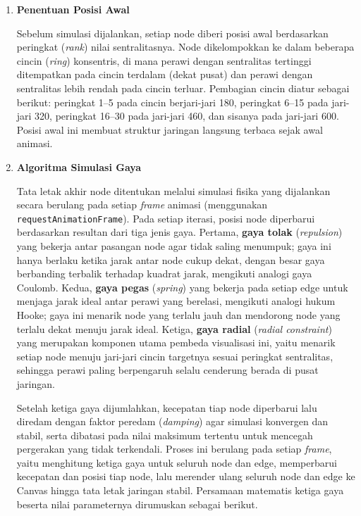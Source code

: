 \begin{enumerate}
\item \textbf{Penentuan Posisi Awal}

Sebelum simulasi dijalankan, setiap node diberi posisi awal berdasarkan peringkat (\textit{rank}) nilai sentralitasnya. Node dikelompokkan ke dalam beberapa cincin (\textit{ring}) konsentris, di mana perawi dengan sentralitas tertinggi ditempatkan pada cincin terdalam (dekat pusat) dan perawi dengan sentralitas lebih rendah pada cincin terluar. Pembagian cincin diatur sebagai berikut: peringkat 1--5 pada cincin berjari-jari 180, peringkat 6--15 pada jari-jari 320, peringkat 16--30 pada jari-jari 460, dan sisanya pada jari-jari 600. Posisi awal ini membuat struktur jaringan langsung terbaca sejak awal animasi.

\item \textbf{Algoritma Simulasi Gaya}

Tata letak akhir node ditentukan melalui simulasi fisika yang dijalankan secara berulang pada setiap \textit{frame} animasi (menggunakan \texttt{requestAnimation}\allowbreak\texttt{Frame}). Pada setiap iterasi, posisi node diperbarui berdasarkan resultan dari tiga jenis gaya. Pertama, \textbf{gaya tolak} (\textit{repulsion}) yang bekerja antar pasangan node agar tidak saling menumpuk; gaya ini hanya berlaku ketika jarak antar node cukup dekat, dengan besar gaya berbanding terbalik terhadap kuadrat jarak, mengikuti analogi gaya Coulomb. Kedua, \textbf{gaya pegas} (\textit{spring}) yang bekerja pada setiap edge untuk menjaga jarak ideal antar perawi yang berelasi, mengikuti analogi hukum Hooke; gaya ini menarik node yang terlalu jauh dan mendorong node yang terlalu dekat menuju jarak ideal. Ketiga, \textbf{gaya radial} (\textit{radial constraint}) yang merupakan komponen utama pembeda visualisasi ini, yaitu menarik setiap node menuju jari-jari cincin targetnya sesuai peringkat sentralitas, sehingga perawi paling berpengaruh selalu cenderung berada di pusat jaringan.

Setelah ketiga gaya dijumlahkan, kecepatan tiap node diperbarui lalu diredam dengan faktor peredam (\textit{damping}) agar simulasi konvergen dan stabil, serta dibatasi pada nilai maksimum tertentu untuk mencegah pergerakan yang tidak terkendali. Proses ini berulang pada setiap \textit{frame}, yaitu menghitung ketiga gaya untuk seluruh node dan edge, memperbarui kecepatan dan posisi tiap node, lalu merender ulang seluruh node dan edge ke Canvas hingga tata letak jaringan stabil. Persamaan matematis ketiga gaya beserta nilai parameternya dirumuskan sebagai berikut.


\end{enumerate}
